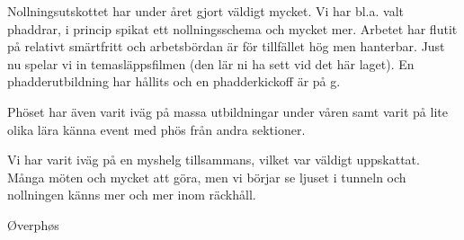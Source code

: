 \documentclass[../_main/handlingar.tex]{subfiles}
\begin{document}
Nollningsutskottet har under året gjort väldigt mycket. Vi har bl.a. valt phaddrar, i princip spikat ett nollningsschema och mycket mer. Arbetet har flutit på relativt smärtfritt och arbetsbördan är för tillfället hög men hanterbar. Just nu spelar vi in temasläppsfilmen (den lär ni ha sett vid det här laget). En phadderutbildning har hållits och en phadderkickoff är på g.

Phöset har även varit iväg på massa utbildningar under våren samt varit på lite olika lära känna event med phös från andra sektioner.

Vi har varit iväg på en myshelg tillsammans, vilket var väldigt uppskattat. Många möten och mycket att göra, men vi börjar se ljuset i tunneln och nollningen känns mer och mer inom räckhåll.

\begin{signatures}{1}
    \mvh
    \signature{Andreas Bennström}{Øverphøs}
\end{signatures}
\end{document}
